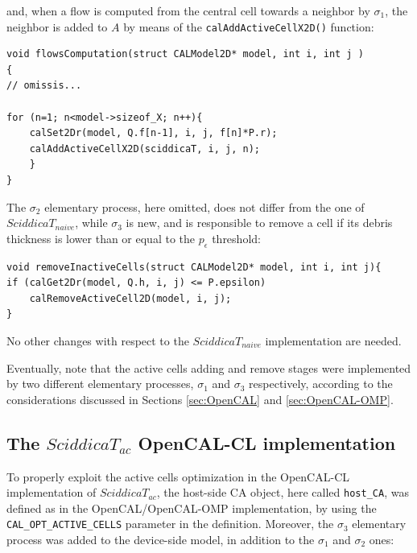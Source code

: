 \noindent and, when a flow is computed from the central cell
towards a neighbor by $\sigma_1$, the neighbor is added to $A$ by
means of the \verb'calAddActiveCellX2D()' function:

\begin{lstlisting}
void flowsComputation(struct CALModel2D* model, int i, int j )
{
// omissis...

for (n=1; n<model->sizeof_X; n++){
	calSet2Dr(model, Q.f[n-1], i, j, f[n]*P.r);
	calAddActiveCellX2D(sciddicaT, i, j, n);
	}
}
\end{lstlisting}

\noindent The $\sigma_2$ elementary process, here omitted, does
not differ from the one of $SciddicaT_{naive}$, while $\sigma_3$
is new, and is responsible to remove a cell if its debris
thickness is lower than or equal to the $p_\epsilon$ threshold:

\begin{lstlisting}
void removeInactiveCells(struct CALModel2D* model, int i, int j){
if (calGet2Dr(model, Q.h, i, j) <= P.epsilon)
	calRemoveActiveCell2D(model, i, j);
}
\end{lstlisting}

\noindent No other changes with respect to the $SciddicaT_{naive}$
implementation are needed.

Eventually, note that the active cells adding and remove stages
were implemented by two different elementary processes, $\sigma_1$
and $\sigma_3$ respectively, according to the considerations
discussed in Sections \ref{sec:OpenCAL} and \ref{sec:OpenCAL-OMP}.

\subsection{The $SciddicaT_{ac}$ OpenCAL-CL implementation}
To properly exploit the active cells optimization in the
OpenCAL-CL implementation of $SciddicaT_{ac}$, the host-side CA
object, here called \verb'host_CA', was defined as in the
OpenCAL/OpenCAL-OMP implementation, by using the
\verb'CAL_OPT_ACTIVE_CELLS' parameter in the definition. Moreover,
the $\sigma_3$ elementary process was added to the device-side
model, in addition to the $\sigma_1$ and $\sigma_2$ ones:

